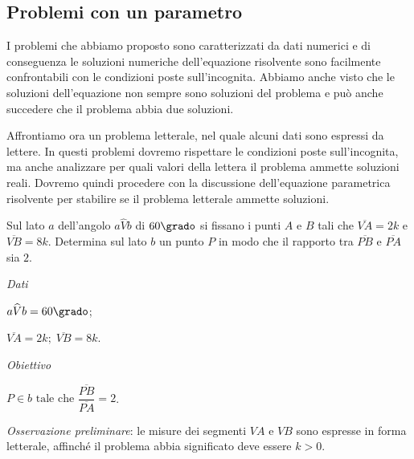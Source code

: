 \subsection{Problemi con un parametro}

I problemi che abbiamo proposto sono caratterizzati da dati numerici e di conseguenza le soluzioni numeriche dell'equazione risolvente sono facilmente
confrontabili con le condizioni poste sull'incognita. Abbiamo anche visto che le soluzioni dell'equazione non sempre sono soluzioni del problema e
può anche succedere che il problema abbia due soluzioni.

Affrontiamo ora un problema letterale, nel quale alcuni dati sono espressi da lettere. In questi problemi dovremo rispettare le condizioni poste sull'incognita, ma anche analizzare per quali valori della lettera il problema ammette soluzioni reali. Dovremo quindi procedere con la discussione dell'equazione parametrica risolvente per stabilire se il problema letterale ammette soluzioni.

\begin{problema}
Sul lato $ a $ dell'angolo $ a \widehat{V} b $ di $ 60\grado $ si fissano i punti $ A $ e $ B $ tali che $ \overline{VA} = 2 k $ e $ \overline {VB} = 8 k $.
Determina sul lato $ b $ un punto $ P $ in modo che il rapporto tra $\overline{PB}$ e $\overline{PA}$ sia $2$.
\end{problema}

\begin{multicols}{2}
\emph{Dati}

$a \widehat{V} b = 60\grado$;

$\overline {VA} = 2 k; \;
 \overline {VB} = 8 k $.

\emph{Obiettivo}

$P \in b \text{ tale che } \dfrac{\overline{PB}}{\overline{PA}} = 2$.
\begin{center}
 
\end{center}

\end{multicols}
\emph{Osservazione preliminare}: le misure dei segmenti $ VA $ e $ VB $ sono espresse in forma letterale, affinché il problema abbia significato deve essere
$k > 0$.

